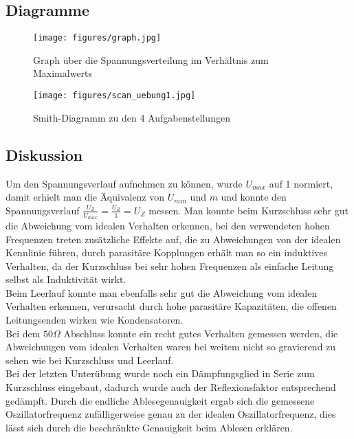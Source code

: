\documentclass[12pt,a4paper,ngerman]{article}
\begin{document}
\pagebreak
\subsection{Diagramme}


\begin{figure}[h!]
\centering
\texttt{[image: figures/graph.jpg]}
\caption{Graph über die Spannungsverteilung im Verhältnis zum Maximalwerts}
\end{figure}

\pagebreak
\begin{figure}[h!]
\centering
\texttt{[image: figures/scan\_uebung1.jpg]} 
\caption{Smith-Diagramm zu den 4 Aufgabenstellungen}
\end{figure}

\subsection{Diskussion}
Um den Spannungsverlauf aufnehmen zu können, wurde $U_{max}$ auf 1 normiert, damit erhielt man die Äquivalenz von $U_{min}$ und $m$ und konnte den Spannungsverlauf $\frac{U_Z}{U_{max}} = \frac{U_Z}{1} = U_Z$ messen. Man konnte beim Kurzschluss sehr gut die Abweichung vom idealen Verhalten erkennen, bei den verwendeten hohen Frequenzen treten zusätzliche Effekte auf, die zu Abweichungen von der idealen Kennlinie führen, durch parasitäre Kopplungen erhält man so ein induktives Verhalten, da der Kurzschluss bei sehr hohen Frequenzen als einfache Leitung selbst als Induktivität wirkt. \\
Beim Leerlauf konnte man ebenfalls sehr gut die Abweichung vom idealen Verhalten erkennen, verursacht durch hohe parasitäre Kapazitäten, die offenen Leitungsenden wirken wie Kondensatoren. \\
Bei dem $50 \Omega$ Abschluss konnte ein recht gutes Verhalten gemessen werden, die Abweichungen vom idealen Verhalten waren bei weitem nicht so gravierend zu sehen wie bei Kurzschluss und Leerlauf. \\
Bei der letzten Unterübung wurde noch ein Dämpfungsglied in Serie zum Kurzschluss eingebaut, dadurch wurde auch der Reflexionsfaktor entsprechend gedämpft.
Durch die endliche Ablesegenauigkeit ergab sich die gemessene Oszillatorfrequenz zufälligerweise genau zu der idealen Oszillatorfrequenz, dies lässt sich durch die beschränkte Genauigkeit beim Ablesen erklären. 
\pagebreak
\end{document}
